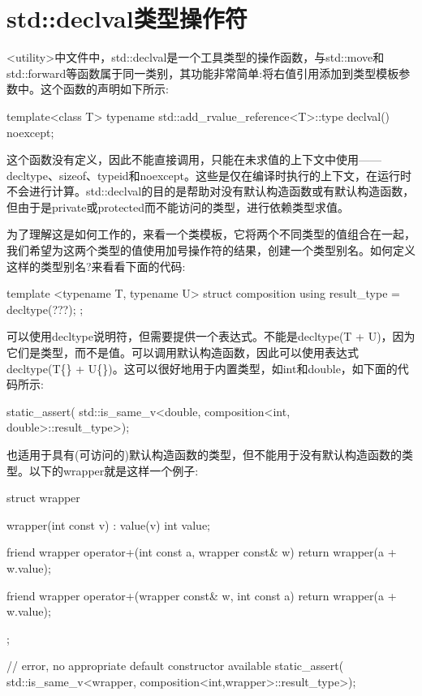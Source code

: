 \section{std::declval类型操作符}
<utility>中文件中，std::declval是一个工具类型的操作函数，与std::move和std::forward等函数属于同一类别，其功能非常简单:将右值引用添加到类型模板参数中。这个函数的声明如下所示:

\begin{cpp}
template<class T>
typename std::add_rvalue_reference<T>::type declval() noexcept;
\end{cpp}

这个函数没有定义，因此不能直接调用，只能在未求值的上下文中使用——decltype、sizeof、typeid和noexcept。这些是仅在编译时执行的上下文，在运行时不会进行计算。std::declval的目的是帮助对没有默认构造函数或有默认构造函数，但由于是private或protected而不能访问的类型，进行依赖类型求值。

为了理解这是如何工作的，来看一个类模板，它将两个不同类型的值组合在一起，我们希望为这两个类型的值使用加号操作符的结果，创建一个类型别名。如何定义这样的类型别名?来看看下面的代码:

\begin{cpp}
template <typename T, typename U>
struct composition
{
	using result_type = decltype(???);
};
\end{cpp}

可以使用decltype说明符，但需要提供一个表达式。不能是decltype(T + U)，因为它们是类型，而不是值。可以调用默认构造函数，因此可以使用表达式decltype(T\{\} + U\{\})。这可以很好地用于内置类型，如int和double，如下面的代码所示:

\begin{cpp}
static_assert(
	std::is_same_v<double,
		composition<int, double>::result_type>);
\end{cpp}

也适用于具有(可访问的)默认构造函数的类型，但不能用于没有默认构造函数的类型。以下的wrapper就是这样一个例子:

\begin{cpp}
struct wrapper
{
	wrapper(int const v) : value(v){}
	int value;
	
	friend wrapper operator+(int const a, wrapper const& w)
	{
		return wrapper(a + w.value);
	}

	friend wrapper operator+(wrapper const& w, int const a)
	{
		return wrapper(a + w.value);
	}
};

// error, no appropriate default constructor available
static_assert(
	std::is_same_v<wrapper,
		composition<int,wrapper>::result_type>);
\end{cpp}

